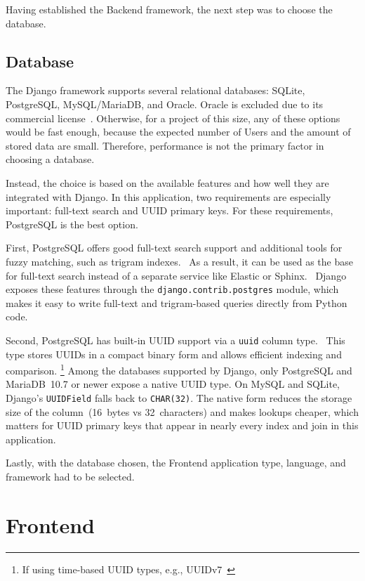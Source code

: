 Having established the Backend framework, the next step was to choose the database.

\subsection{Database}
The Django framework supports several relational databases:
SQLite, PostgreSQL, MySQL/MariaDB, and Oracle.
Oracle is excluded due to its commercial license~\parencite{oracle_pricing}.
Otherwise, for a project of this size, any of these options would be fast enough, because the expected
number of Users and the amount of stored data are small.
Therefore, performance is not the primary factor in choosing a database.

Instead, the choice is based on the available features and how well they are integrated
with Django.
In this application, two requirements are especially important: full-text search and
UUID primary keys. For these requirements, PostgreSQL is the best option.

First, PostgreSQL offers good full-text search support and additional tools for
fuzzy matching, such as trigram indexes.~\parencite{postgres_fulltext}
As a result, it can be used as the base for full-text search
instead of a separate service like Elastic or Sphinx.~\parencite{elastic, sphinx_search}
Django exposes these features through the
\texttt{django.\-contrib.\-postgres} module, which makes it easy to write full-text and
trigram-based queries directly from Python code.~\parencite{postgres,django_postgres}

Second, PostgreSQL has built-in UUID support via a \texttt{uuid} column
type.~\parencite{postgres_uuid}
This type stores UUIDs in a compact binary form and allows efficient indexing
and comparison.
\footnote{If using time-based UUID types, e.g., UUIDv7~\parencite{uuid_v7}}
Among the databases supported by Django, only PostgreSQL and MariaDB~10.7 or
newer expose a native UUID type. On MySQL and SQLite, Django's
\texttt{UUIDField} falls back to \texttt{CHAR(32)}.
The native form reduces the storage size of the column~(16~bytes vs
32~characters) and makes lookups cheaper, which matters for UUID
primary keys that appear in nearly every index and join in this application.

Lastly, with the database chosen, the Frontend application type,
language, and framework had to be selected.


\section{Frontend}

